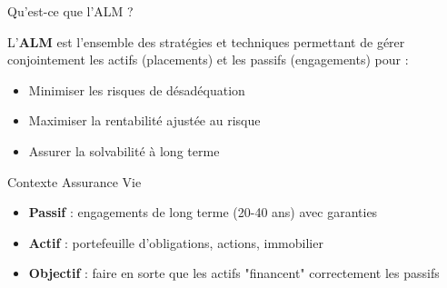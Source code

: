\documentclass[10pt,aspectratio=169]{beamer}
\begin{document}
\begin{frame}{Qu'est-ce que l'ALM ?}
\begin{definition}
L'\textbf{ALM} est l'ensemble des stratégies et techniques permettant de gérer conjointement les actifs (placements) et les passifs (engagements) pour :
\begin{itemize}
    \item Minimiser les risques de désadéquation
    \item Maximiser la rentabilité ajustée au risque
    \item Assurer la solvabilité à long terme
\end{itemize}
\end{definition}

\vspace{0.3cm}
\begin{block}{Contexte Assurance Vie}
\begin{itemize}
    \item \textbf{Passif} : engagements de long terme (20-40 ans) avec garanties
    \item \textbf{Actif} : portefeuille d'obligations, actions, immobilier
    \item \textbf{Objectif} : faire en sorte que les actifs "financent" correctement les passifs
\end{itemize}
\end{block}
\end{frame}
\end{document}
